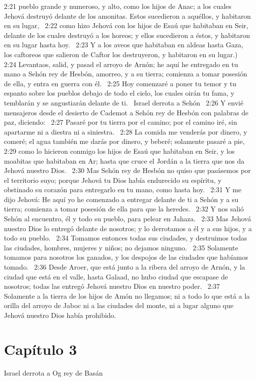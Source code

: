 2:21 pueblo grande y numeroso, y alto, como los hijos de Anac; a los cuales Jehová destruyó delante de los amonitas. Estos sucedieron a aquéllos, y habitaron en su lugar,  
2:22 como hizo Jehová con los hijos de Esaú que habitaban en Seir, delante de los cuales destruyó a los horeos; y ellos sucedieron a éstos, y habitaron en su lugar hasta hoy.  
2:23 Y a los aveos que habitaban en aldeas hasta Gaza, los caftoreos que salieron de Caftor los destruyeron, y habitaron en su lugar.)  
2:24 Levantaos, salid, y pasad el arroyo de Arnón; he aquí he entregado en tu mano a Sehón rey de Hesbón, amorreo, y a su tierra; comienza a tomar posesión de ella, y entra en guerra con él.  
2:25 Hoy comenzaré a poner tu temor y tu espanto sobre los pueblos debajo de todo el cielo, los cuales oirán tu fama, y temblarán y se angustiarán delante de ti.  
Israel derrota a Sehón   
2:26 Y envié mensajeros desde el desierto de Cademot a Sehón rey de Hesbón con palabras de paz, diciendo:  
2:27 Pasaré por tu tierra por el camino; por el camino iré, sin apartarme ni a diestra ni a siniestra.  
2:28 La comida me venderás por dinero, y comeré; el agua también me darás por dinero, y beberé; solamente pasaré a pie,  
2:29 como lo hicieron conmigo los hijos de Esaú que habitaban en Seir, y los moabitas que habitaban en Ar; hasta que cruce el Jordán a la tierra que nos da Jehová nuestro Dios.  
2:30 Mas Sehón rey de Hesbón no quiso que pasásemos por el territorio suyo; porque Jehová tu Dios había endurecido su espíritu, y obstinado su corazón para entregarlo en tu mano, como hasta hoy.  
2:31 Y me dijo Jehová: He aquí yo he comenzado a entregar delante de ti a Sehón y a su tierra; comienza a tomar posesión de ella para que la heredes.  
2:32 Y nos salió Sehón al encuentro, él y todo su pueblo, para pelear en Jahaza.  
2:33 Mas Jehová nuestro Dios lo entregó delante de nosotros; y lo derrotamos a él y a sus hijos, y a todo su pueblo.  
2:34 Tomamos entonces todas sus ciudades, y destruimos todas las ciudades, hombres, mujeres y niños; no dejamos ninguno.  
2:35 Solamente tomamos para nosotros los ganados, y los despojos de las ciudades que habíamos tomado.  
2:36 Desde Aroer, que está junto a la ribera del arroyo de Arnón, y la ciudad que está en el valle, hasta Galaad, no hubo ciudad que escapase de nosotros; todas las entregó Jehová nuestro Dios en nuestro poder.  
2:37 Solamente a la tierra de los hijos de Amón no llegamos; ni a todo lo que está a la orilla del arroyo de Jaboc ni a las ciudades del monte, ni a lugar alguno que Jehová nuestro Dios había prohibido.  
\section*{Capítulo 3}
Israel derrota a Og rey de Basán  

